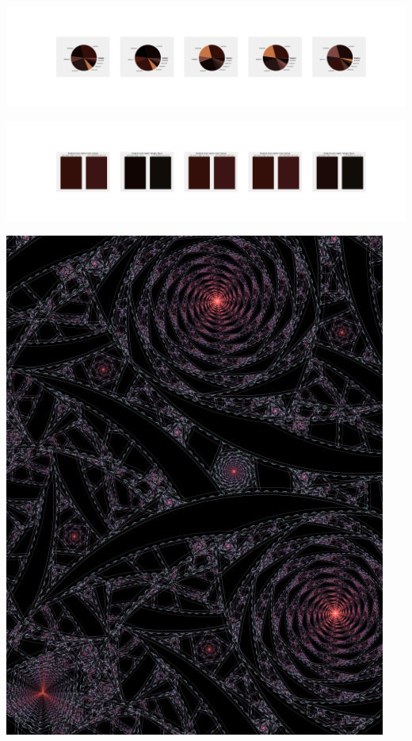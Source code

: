 \documentclass[11pt]{article}
\begin{document}
\begin{landscape}
    \begin{center}
    \includegraphics[width=250mm]{./nbimg/pie-404.jpg}
    \end{center}

    \begin{center}
    \includegraphics[width=250mm]{./nbimg/peak-404.jpg}
    \end{center}
    

    \begin{center}
    \includegraphics[width=\textwidth]{./nbimg/file (58).jpg}
    \end{center}


\end{landscape}
\end{document}
